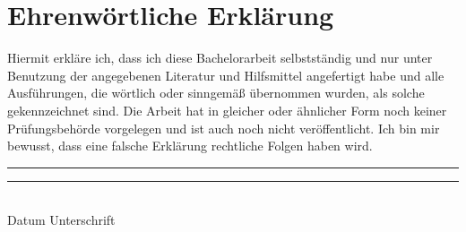 \chapter*{Ehrenwörtliche Erklärung}

Hiermit erkläre ich, dass ich diese Bachelorarbeit  selbstständig  und  nur  unter  Benutzung  
der  angegebenen  Literatur  und  Hilfsmittel  angefertigt  habe  und  alle  Ausführungen,  die  
wörtlich  oder  sinngemäß  übernommen  wurden,  als  solche  gekennzeichnet  sind.  Die  Arbeit  
hat  in  gleicher  oder  ähnlicher  Form  noch  keiner  Prüfungsbehörde  vorgelegen  und  ist  
auch  noch  nicht veröffentlicht. Ich bin mir bewusst, dass eine falsche Erklärung rechtliche 
Folgen haben wird.

\vspace{5cm}

\rule{3.5cm}{1pt} \hspace{1.5cm} \rule{10cm}{1pt}\\
Datum \hspace{4cm} Unterschrift\\